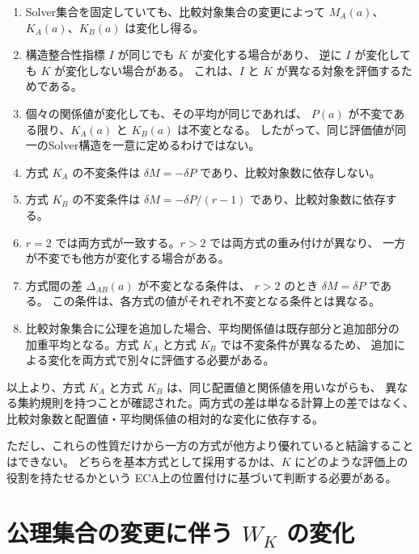 \documentclass[a4paper,11pt]{ltjsarticle}
\begin{document}
\begin{enumerate}
\item Solver集合を固定していても、比較対象集合の変更によって
      $M_A(a)$、$K_A(a)$、$K_B(a)$ は変化し得る。

\item 構造整合性指標 $I$ が同じでも $K$ が変化する場合があり、
      逆に $I$ が変化しても $K$ が変化しない場合がある。
      これは、$I$ と $K$ が異なる対象を評価するためである。

\item 個々の関係値が変化しても、その平均が同じであれば、
      $P(a)$ が不変である限り、$K_A(a)$ と $K_B(a)$ は不変となる。
      したがって、同じ評価値が同一のSolver構造を一意に定めるわけではない。

\item 方式 $K_A$ の不変条件は
      $\delta M=-\delta P$ であり、比較対象数に依存しない。

\item 方式 $K_B$ の不変条件は
      $\delta M=-\delta P/(r-1)$ であり、比較対象数に依存する。

\item $r=2$ では両方式が一致する。$r>2$ では両方式の重み付けが異なり、
      一方が不変でも他方が変化する場合がある。

\item 方式間の差 $\Delta_{AB}(a)$ が不変となる条件は、
      $r>2$ のとき $\delta M=\delta P$ である。
      この条件は、各方式の値がそれぞれ不変となる条件とは異なる。

\item 比較対象集合に公理を追加した場合、平均関係値は既存部分と追加部分の
      加重平均となる。方式 $K_A$ と方式 $K_B$ では不変条件が異なるため、
      追加による変化を両方式で別々に評価する必要がある。
\end{enumerate}

以上より、方式 $K_A$ と方式 $K_B$ は、同じ配置値と関係値を用いながらも、
異なる集約規則を持つことが確認された。両方式の差は単なる計算上の差ではなく、
比較対象数と配置値・平均関係値の相対的な変化に依存する。

ただし、これらの性質だけから一方の方式が他方より優れていると結論することはできない。
どちらを基本方式として採用するかは、$K$ にどのような評価上の役割を持たせるかという
ECA上の位置付けに基づいて判断する必要がある。



\clearpage
\section{公理集合の変更に伴う $W_K$ の変化}
\label{sec:WK-set-change}
\end{document}
